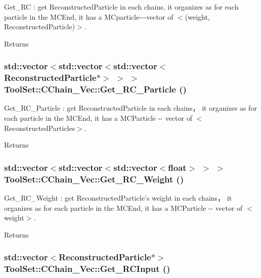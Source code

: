 Get\_\-RC : get ReconstructedParticle in each chains, it organizes as for each particle in the MCEnd, it has a MCparticle-\/-\/-\/vector of $<$(weight, ReconstructedParticle)$>$. \begin{DoxyReturn}{Returns}

\end{DoxyReturn}
\hypertarget{classToolSet_1_1CChain__Vec_a79fd8a76d1edea4876f2a1c6aaabadf2}{
\subsubsection[{Get\_\-RC\_\-Particle}]{\setlength{\rightskip}{0pt plus 5cm}std::vector$<$std::vector$<$std::vector$<$ReconstructedParticle$\ast$$>$ $>$ $>$ ToolSet::CChain\_\-Vec::Get\_\-RC\_\-Particle ()}}
\label{classToolSet_1_1CChain__Vec_a79fd8a76d1edea4876f2a1c6aaabadf2}


Get\_\-RC\_\-Particle : get ReconstructedParticle in each chains， it organizes as for each particle in the MCEnd, it has a MCParticle -\/-\/ vector of $<$ReconstructedParticles$>$. \begin{DoxyReturn}{Returns}

\end{DoxyReturn}
\hypertarget{classToolSet_1_1CChain__Vec_aeb5adc8cde13c82d7727efb02241d637}{
\subsubsection[{Get\_\-RC\_\-Weight}]{\setlength{\rightskip}{0pt plus 5cm}std::vector$<$std::vector$<$std::vector$<$float$>$ $>$ $>$ ToolSet::CChain\_\-Vec::Get\_\-RC\_\-Weight ()}}
\label{classToolSet_1_1CChain__Vec_aeb5adc8cde13c82d7727efb02241d637}


Get\_\-RC\_\-Weight : get ReconstructedParticle's weight in each chains， it organizes as for each particle in the MCEnd, it has a MCParticle -\/-\/ vector of $<$weight$>$. \begin{DoxyReturn}{Returns}

\end{DoxyReturn}
\hypertarget{classToolSet_1_1CChain__Vec_aba6a8082d60fbc646abebfd98665c8f0}{
\subsubsection[{Get\_\-RCInput}]{\setlength{\rightskip}{0pt plus 5cm}std::vector$<$ReconstructedParticle$\ast$$>$ ToolSet::CChain\_\-Vec::Get\_\-RCInput ()}}
\label{classToolSet_1_1CChain__Vec_aba6a8082d60fbc646abebfd98665c8f0}


